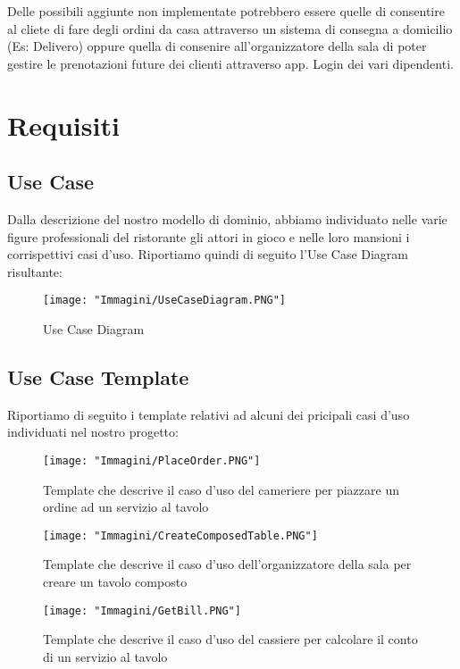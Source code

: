 \documentclass{article}
\begin{document}
Delle possibili aggiunte non implementate potrebbero essere quelle di consentire al cliete di fare degli ordini da casa attraverso un sistema di consegna a domicilio (Es: Delivero) oppure quella di consenire all'organizzatore della sala di poter gestire le prenotazioni future dei clienti attraverso app. Login dei vari dipendenti. 


\newpage

\section{Requisiti}
\subsection{Use Case}
Dalla descrizione del nostro modello di dominio, abbiamo individuato nelle varie figure professionali del ristorante gli attori in gioco e nelle loro mansioni i corrispettivi casi d'uso. Riportiamo quindi di seguito l'Use Case Diagram risultante:

\begin{figure}[!h]
\centering
\texttt{[image: "Immagini/UseCaseDiagram.PNG"]}
\caption{Use Case Diagram}
\end{figure}

\newpage

\subsection{Use Case Template}
Riportiamo di seguito i template relativi ad alcuni dei pricipali casi d'uso individuati nel nostro progetto:

\begin{figure}[!h]
\centering
\texttt{[image: "Immagini/PlaceOrder.PNG"]}
\caption{Template che descrive il caso d'uso del cameriere per piazzare un ordine ad un servizio al tavolo}
\end{figure}

\begin{figure}[!h]
\centering
\texttt{[image: "Immagini/CreateComposedTable.PNG"]}
\caption{Template che descrive il caso d'uso dell'organizzatore della sala per creare un tavolo composto}
\end{figure}

\newpage

\begin{figure}[!h]
\centering
\texttt{[image: "Immagini/GetBill.PNG"]}
\caption{Template che descrive il caso d'uso del cassiere per calcolare il conto di un servizio al tavolo}
\end{figure}
\end{document}
